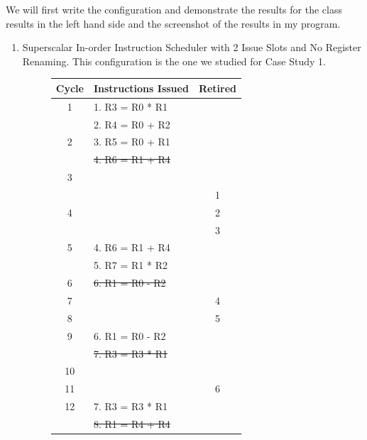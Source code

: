 \documentclass{article}
\begin{document}
We will first write the configuration and demonstrate the results for the class results in the left hand side and the screenshot of the results in my program.
\newpage
\begin{enumerate}
    \item Superscalar In-order Instruction Scheduler with 2 Issue Slots and No Register Renaming. This configuration is the one we studied for Case Study 1.
    \begin{figure}[H]
        \centering{}
        \begin{minipage}[t]{0.45\textwidth}
            \centering
            \renewcommand{\arraystretch}{0.8} %
            \setlength{\tabcolsep}{3pt} %
            \begin{tabular}{|c|p{3.4cm}|c|}
                \hline
                \textbf{Cycle} & \textbf{Instructions Issued} & \textbf{Retired} \\ \hline
                1 & 1. R3 = R0 * R1 & \\ 
                  & 2. R4 = R0 + R2 & \\ \hline
                2 & 3. R5 = R0 + R1 & \\ 
                  & \sout{4. R6 = R1 + R4} & \\ \hline
                3 &                 & \\ \hline
                 &                 & 1 \\ 
                4 &                 & 2 \\ 
                 &                 & 3 \\ \hline
                5 & 4. R6 = R1 + R4 & \\
                  & 5. R7 = R1 * R2 & \\ \hline 
                6 & \sout{6. R1 = R0 - R2} & \\ \hline
                7 & & 4 \\ \hline 
                8 & & 5 \\ \hline 
                9 & 6. R1 = R0 - R2 & \\ \hline
                  & \sout{7. R3 = R3 * R1} & \\ \hline
                10 & & \\ \hline 
                11 & & 6 \\ \hline 
                12 & 7. R3 = R3 * R1 & \\ \hline 
                & \sout{8. R1 = R4 + R4} & \\ \hline

\end{tabular}
\end{minipage}
\end{figure}
\end{enumerate}
\end{document}
